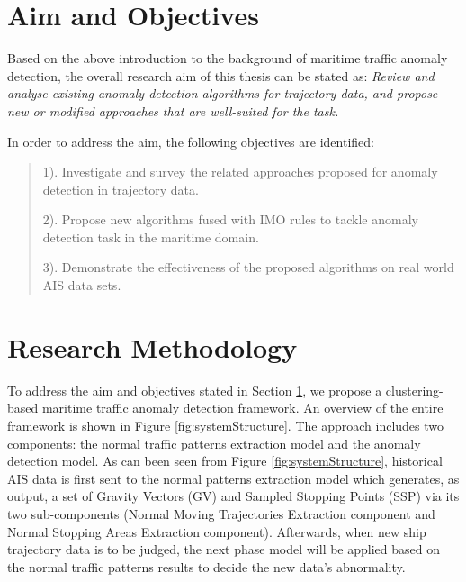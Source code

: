 \documentclass[12pt,glossary]{dalcsthesis}
\begin{document}





\section{Aim and Objectives}
\label{sec:aim_and_objectives}

Based on the above introduction to the background of maritime traffic anomaly detection, the overall research aim of this thesis can be stated as:  \emph{Review and analyse existing anomaly detection algorithms for trajectory data, and propose new or modified approaches that are well-suited for the task.}

In order to address the aim, the following objectives are identified:

\begin{quote}
1). Investigate and survey the related approaches proposed for anomaly detection in trajectory data.

2). Propose new algorithms fused with IMO rules to tackle anomaly detection task in the maritime domain.

3). Demonstrate the effectiveness of the proposed algorithms on real world AIS data sets.

\end{quote}


\section{Research Methodology}
To address the aim and objectives stated in Section \ref{sec:aim_and_objectives}, we propose a clustering-based maritime traffic anomaly detection framework. An overview of the entire framework  is shown in Figure \ref{fig:systemStructure}.
The approach includes two components: the normal traffic patterns extraction model and the anomaly detection model. As can been seen from Figure \ref{fig:systemStructure}, historical AIS data is first sent to the normal patterns extraction model which generates, as output, a set of Gravity Vectors (GV) and Sampled Stopping Points (SSP) via its two sub-components (Normal Moving Trajectories Extraction component and Normal Stopping Areas Extraction component). Afterwards, when new ship trajectory data is to be judged, the next phase model will be applied based on the normal traffic patterns results to decide the new data's abnormality. 
\end{document}
